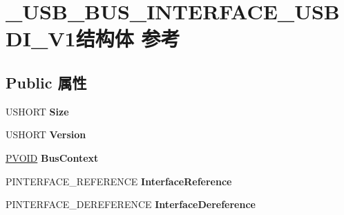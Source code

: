 \hypertarget{struct___u_s_b___b_u_s___i_n_t_e_r_f_a_c_e___u_s_b_d_i___v1}{}\section{\+\_\+\+U\+S\+B\+\_\+\+B\+U\+S\+\_\+\+I\+N\+T\+E\+R\+F\+A\+C\+E\+\_\+\+U\+S\+B\+D\+I\+\_\+\+V1结构体 参考}
\label{struct___u_s_b___b_u_s___i_n_t_e_r_f_a_c_e___u_s_b_d_i___v1}
\subsection*{Public 属性}
\begin{DoxyCompactItemize}
\item 
\mbox{\label{struct___u_s_b___b_u_s___i_n_t_e_r_f_a_c_e___u_s_b_d_i___v1_acf72a36e512277a686b33818d138a414}} 
U\+S\+H\+O\+RT {\bfseries Size}
\item 
\mbox{\label{struct___u_s_b___b_u_s___i_n_t_e_r_f_a_c_e___u_s_b_d_i___v1_a31cc336bf87e4f0a7e0b92f1ab97f718}} 
U\+S\+H\+O\+RT {\bfseries Version}
\item 
\mbox{\label{struct___u_s_b___b_u_s___i_n_t_e_r_f_a_c_e___u_s_b_d_i___v1_aaddb40662690189b53d9d365f8a33043}} 
\hyperlink{interfacevoid}{P\+V\+O\+ID} {\bfseries Bus\+Context}
\item 
\mbox{\label{struct___u_s_b___b_u_s___i_n_t_e_r_f_a_c_e___u_s_b_d_i___v1_a340e273158b57403eae999f5253549f4}} 
P\+I\+N\+T\+E\+R\+F\+A\+C\+E\+\_\+\+R\+E\+F\+E\+R\+E\+N\+CE {\bfseries Interface\+Reference}
\item 
\mbox{\label{struct___u_s_b___b_u_s___i_n_t_e_r_f_a_c_e___u_s_b_d_i___v1_a46a1e9a390f230efc21a09efa7911ac9}} 
P\+I\+N\+T\+E\+R\+F\+A\+C\+E\+\_\+\+D\+E\+R\+E\+F\+E\+R\+E\+N\+CE {\bfseries Interface\+Dereference}
\item 
\mbox{\label{struct___u_s_b___b_u_s___i_n_t_e_r_f_a_c_e___u_s_b_d_i___v1_a6a6c14b06f0ab7f12216848b4400fc65}} 

\end{DoxyCompactItemize}
